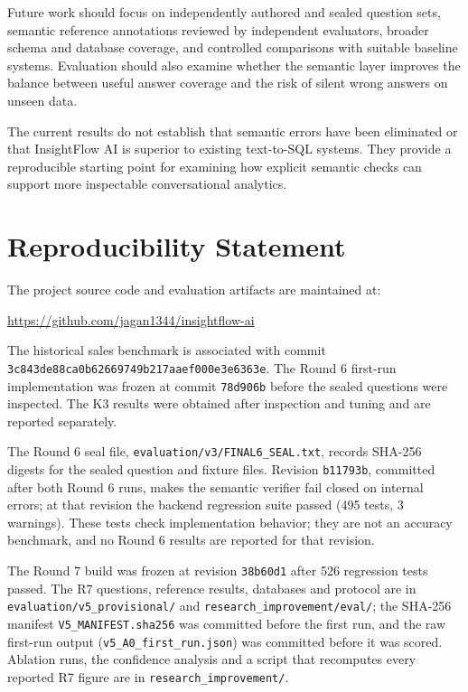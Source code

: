 \documentclass[conference]{IEEEtran}
\begin{document}
Future work should focus on independently authored and sealed question sets, semantic reference annotations reviewed by independent evaluators, broader schema and database coverage, and controlled comparisons with suitable baseline systems. Evaluation should also examine whether the semantic layer improves the balance between useful answer coverage and the risk of silent wrong answers on unseen data.

The current results do not establish that semantic errors have been eliminated or that InsightFlow AI is superior to existing text-to-SQL systems. They provide a reproducible starting point for examining how explicit semantic checks can support more inspectable conversational analytics.

\section*{Reproducibility Statement}

The project source code and evaluation artifacts are maintained at:

\url{https://github.com/jagan1344/insightflow-ai}

The historical sales benchmark is associated with commit \texttt{3c843de88c\allowbreak{}a0b6266974\allowbreak{}9b217aaef0\allowbreak{}00e3e6363e}. The Round 6 first-run implementation was frozen at commit \texttt{78d906b} before the sealed questions were inspected. The K3 results were obtained after inspection and tuning and are reported separately.

The Round 6 seal file, \texttt{evaluation/\allowbreak{}v3/\allowbreak{}FINAL6\_SEAL.txt}, records SHA-256 digests for the sealed question and fixture files. Revision \texttt{b11793b}, committed after both Round 6 runs, makes the semantic verifier fail closed on internal errors; at that revision the backend regression suite passed (495 tests, 3 warnings). These tests check implementation behavior; they are not an accuracy benchmark, and no Round 6 results are reported for that revision.

The Round 7 build was frozen at revision \texttt{38b60d1} after 526 regression tests passed. The R7 questions, reference results, databases and protocol are in \texttt{evaluation/\allowbreak{}v5\_provisional/} and \texttt{research\_\allowbreak{}improvement/\allowbreak{}eval/}; the SHA-256 manifest \texttt{V5\_MANIFEST.sha256} was committed before the first run, and the raw first-run output (\texttt{v5\_A0\_first\_run.json}) was committed before it was scored. Ablation runs, the confidence analysis and a script that recomputes every reported R7 figure are in \texttt{research\_\allowbreak{}improvement/}.
\end{document}
